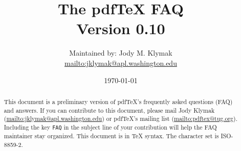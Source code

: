 \documentclass[11pt]{article}
\begin{document}
\newcommand{\maintainer}{Jody Klymak \url{mailto:jklymak@apl.washington.edu}}

\newcommand{\question}[3]{\subsubsection{#2}\label{q:#1}}
\newcommand{\sectionf}[2]{\section{#2} \label{sec:#1}}
\newcommand{\subsectionf}[2]{\subsection{#2} \label{sec:#1}}

\newcommand{\contributor}[3]{\index{#1=#1
    \protect\url{#2}!Q\thesubsubsection}
}

\newcommand{\pathf}[1]{\url{#1}}

\renewcommand{\indexname}{Contributors}
\renewenvironment{theindex}{
 \appendix
 \section{\indexname}
 \begin{itemize}
}
{\end{itemize}}

\title{
  The pdfTeX FAQ \\
  Version 0.10}

\author{
  Maintained by: Jody M. Klymak\\
  \url{mailto:jklymak@apl.washington.edu} }

\date{\today}

\maketitle

\begin{abstract}{ This document is a preliminary version of pdfTeX's
    frequently asked questions (FAQ) and answers. If you can
    contribute to this document, please mail Jody Klymak
    (\url{mailto:jklymak@apl.washington.edu}) or pdfTeX's mailing list
    (\url{mailto:pdftex@tug.org}). Including the key \verb+FAQ+ in the
    subject line of your contribution will help the FAQ maintainer
    stay organized.  This document is in TeX syntax. The character set
    is ISO-8859-2.  }
\end{abstract}
\end{document}
